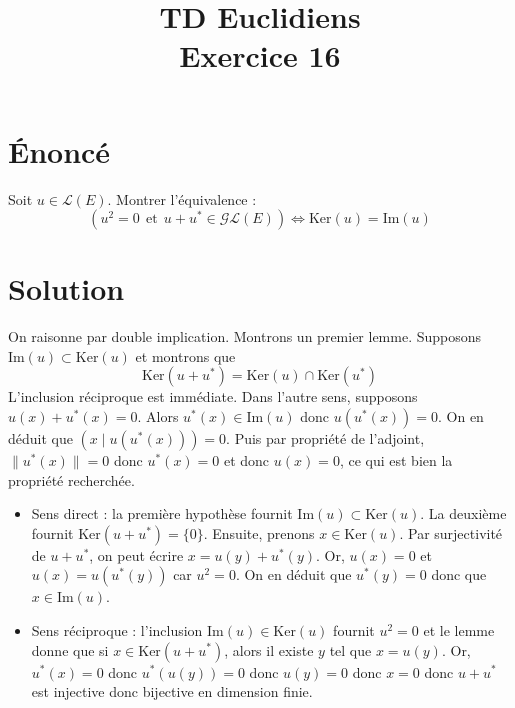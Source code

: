 \documentclass[french]{article}
\title{TD Euclidiens\\ Exercice 16}
\date{}
\newcommand{\st}{^*}
\renewcommand{\ker}{\text{Ker}}
\newcommand{\im}{\text{Im}}
\begin{document}
\maketitle

\section{Énoncé}
Soit $u\in\mathcal{L}(E)$. Montrer l'équivalence : $$\left(u^2=0\ \ \text{et} \ \ u+u\st\in\mathcal{GL}(E)\right)\iff \ker(u)=\im(u)$$
\section{Solution}
On raisonne par double implication. Montrons un premier lemme. Supposons $\im(u)\subset\ker(u)$ et montrons que $$\ker(u+u\st)=\ker(u)\cap\ker(u\st)$$ L'inclusion réciproque est immédiate. Dans l'autre sens, supposons $u(x)+u\st(x)=0$. Alors $u\st(x)\in\im(u)$ donc $u(u\st(x))=0$. On en déduit que $(x\mid u(u\st(x)))=0$. Puis par propriété de l'adjoint, $\lVert u\st(x)\rVert=0$ donc $u\st(x)=0$ et donc $u(x)=0$, ce qui est bien la propriété recherchée.
\begin{itemize}
	\item Sens direct : la première hypothèse fournit $\im(u)\subset\ker(u)$. La deuxième fournit $\ker(u+u\st)=\{0\}$. Ensuite, prenons $x\in\ker(u)$. Par surjectivité de $u+u\st$, on peut écrire $x=u(y)+u\st(y)$. Or, $u(x)=0$ et $u(x)=u(u\st(y))$ car $u^2=0$. On en déduit que $u\st(y)=0$ donc que $x\in\im(u)$. 
	\item Sens réciproque : l'inclusion $\im(u)\in\ker(u)$ fournit $u^2=0$ et le lemme donne que si $x\in\ker(u+u\st)$, alors il existe $y$ tel que $x=u(y)$. Or, $u\st(x)=0$ donc $u\st(u(y))=0$ donc $u(y)=0$ donc $x=0$ donc $u+u\st$ est injective donc bijective en dimension finie.
\end{itemize}
\end{document}
